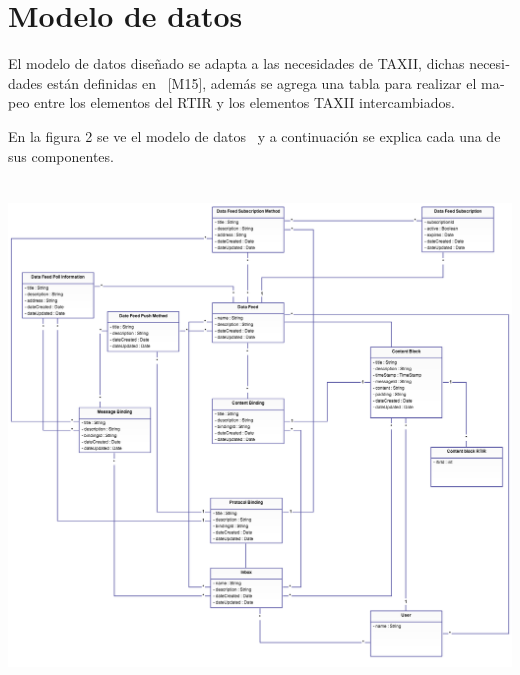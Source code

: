 \documentclass[11pt]{article}
\begin{document}
\bigskip

\section[Modelo de datos]{\foreignlanguage{spanish}{Modelo de datos}}
\foreignlanguage{spanish}{El modelo de datos diseñado se adapta a las necesidades de TAXII, dichas necesidades están
definidas en \ [M15], además se agrega una tabla para realizar el mapeo entre los elementos del RTIR y los elementos
TAXII intercambiados.}

\foreignlanguage{spanish}{En la figura 2 se ve el modelo de datos \ y a continuación se explica cada una de sus
componentes.}

 \includegraphics[width=5.7638in,height=5.3126in]{Diseno-img004.png} 


\bigskip


\bigskip


\bigskip
\end{document}
